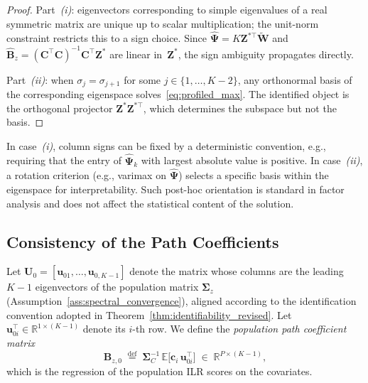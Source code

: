 \begin{proof}
Part~\emph{(i)}: eigenvectors corresponding to simple eigenvalues of a
real symmetric matrix are unique up to scalar multiplication; the
unit-norm constraint restricts this to a sign choice.
Since $\hat{\boldsymbol{\Psi}} = K\mathbf{Z}^{*\top}
\widetilde{\mathbf{W}}$ and $\hat{\mathbf{B}}_z
= (\mathbf{C}^{\!\top}\mathbf{C})^{-1}\mathbf{C}^{\!\top}\mathbf{Z}^*$
are linear in~$\mathbf{Z}^*$, the sign ambiguity propagates directly.

Part~\emph{(ii)}: when $\sigma_j=\sigma_{j+1}$ for some
$j\in\{1,\dots,K{-}2\}$, any orthonormal basis of the corresponding
eigenspace solves~\eqref{eq:profiled_max}. The identified object is
the orthogonal projector
$\mathbf{Z}^*\mathbf{Z}^{*\top}$, which determines the subspace but
not the basis.
\end{proof}

\begin{remark}
\label{rem:resolving_ambiguity}
In case~\emph{(i)}, column signs can be fixed by a deterministic
convention, e.g., requiring that the entry of $\hat{\boldsymbol{\Psi}}_k$
with largest absolute value is positive. In case~\emph{(ii)}, a rotation
criterion (e.g., varimax on $\hat{\boldsymbol{\Psi}}$) selects a
specific basis within the eigenspace for interpretability. Such post-hoc
orientation is standard in factor analysis and does not affect the
statistical content of the solution.
\end{remark}


\subsection{Consistency of the Path Coefficients}
\label{subsec:consistency}

Let $\mathbf{U}_0 = [\mathbf{u}_{01},\dots,\mathbf{u}_{0,K-1}]$
denote the matrix whose columns are the leading $K{-}1$ eigenvectors
of the population matrix $\boldsymbol{\Sigma}_z$
(Assumption~\ref{ass:spectral_convergence}), aligned according to the
identification convention adopted in
Theorem~\ref{thm:identifiability_revised}. Let
$\mathbf{u}_{0i}^{\!\top}\in\mathbb{R}^{1\times(K-1)}$ denote its
$i$-th row. We define the \emph{population path coefficient matrix}
\begin{equation}
  \mathbf{B}_{z,0}
  \;\stackrel{\text{def}}{=}\;
  \boldsymbol{\Sigma}_C^{-1}\,
  \mathbb{E}\!\bigl[\mathbf{c}_i\,\mathbf{u}_{0i}^{\!\top}\bigr]
  \;\in\;\mathbb{R}^{P\times(K-1)},
  \label{eq:Bz0_def}
\end{equation}
which is the regression of the population ILR scores on the covariates.

